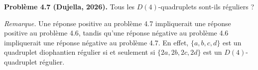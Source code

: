 \textbf{Problème 4.7 (Dujella, 2026).} Tous les $D(4)$-quadruplets sont-ils réguliers ?

\medskip

\textit{Remarque.} Une réponse positive au problème 4.7 impliquerait une réponse positive au problème 4.6, tandis qu'une réponse négative au problème 4.6 impliquerait une réponse négative au problème 4.7. En effet, $\{a,b,c,d\}$ est un quadruplet diophantien régulier si et seulement si $\{2a,2b,2c,2d\}$ est un $D(4)$-quadruplet régulier.
